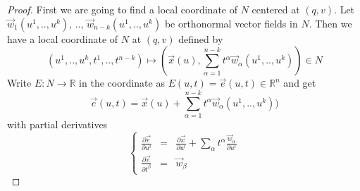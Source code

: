 \documentclass[12pt]{article}
\newcommand{\RR}{\mathbb{R}}      %
\newcommand{\vect}[1]{\vec{#1}}
\begin{document}
\begin{proof}
  First we are going to find a local coordinate of $N$ centered at $(q, v)$. Let
  $\vect{w}_1(u^1, .., u^k)$, .., $\vect{w}_{n-k}(u^1, .., u^k)$ be orthonormal
  vector fields in $N$. Then we have a local coordinate of $N$ at $(q, v)$
  defined by
  \begin{equation}
    (u^1, .., u^k, t^1, .., t^{n-k}) \mapsto (\vect{x}(u),
    \sum_{\alpha=1}^{n-k}t^{\alpha} \vect{w}_{\alpha}(u^1, .., u^k)) \in N
  \end{equation}
  Write $E: N \to \RR$ in the coordinate as $E(u, t) = \vect{e}(u, t) \in \RR^n$
  and get
  \begin{equation}
    \vect{e}(u, t) = \vect{x}(u) + \sum_{\alpha=1}^{n-k}t^{\alpha} \vect{w}_{\alpha}(u^1, .., u^k))
  \end{equation}
  with partial derivatives
  \begin{equation}
    \left\{
      \begin{array}{lcl}
        \frac{\partial \vect{e}}{\partial u^i} & = &
        \frac{\partial \vect{x}}{\partial u^i} + 
        \sum_{\alpha} t^{\alpha}\frac{\vect{w}_{\alpha}}{\partial u^i}  \\
        \frac{\partial \vect{e}}{\partial t^\beta} & = & \vect{w}_\beta
      \end{array}
    \right.
  \end{equation}
  

\end{proof}
\end{document}

